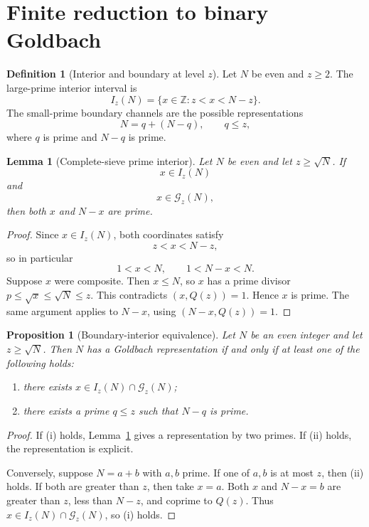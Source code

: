 \documentclass[11pt]{article}
\theoremstyle{plain}
\newtheorem{proposition}[theorem]{Proposition}
\newtheorem{lemma}[theorem]{Lemma}
\theoremstyle{definition}
\newtheorem{definition}[theorem]{Definition}
\theoremstyle{remark}
\newcommand{\Z}{\mathbb Z}
\newcommand{\G}{\mathcal G}
\begin{document}
\section{Finite reduction to binary Goldbach}
\label{sec:goldbach_reduction}

\begin{definition}[Interior and boundary at level \(z\)]
Let \(N\) be even and \(z\ge2\).  The large-prime interior interval is
\[
I_z(N)=\{x\in\Z:z<x<N-z\}.
\]
The small-prime boundary channels are the possible representations
\[
N=q+(N-q),\qquad q\le z,
\]
where \(q\) is prime and \(N-q\) is prime.
\end{definition}

\begin{lemma}[Complete-sieve prime interior]
\label{lem:complete_interior}
Let \(N\) be even and let \(z\ge\sqrt N\).  If
\[
x\in I_z(N)
\]
and
\[
x\in\G_z(N),
\]
then both \(x\) and \(N-x\) are prime.
\end{lemma}

\begin{proof}
Since \(x\in I_z(N)\), both coordinates satisfy
\[
z<x<N-z,
\]
so in particular
\[
1<x<N,
\qquad
1<N-x<N.
\]
Suppose \(x\) were composite.  Then \(x\le N\), so \(x\) has a prime divisor
\(p\le\sqrt x\le\sqrt N\le z\).  This contradicts \((x,Q(z))=1\).  Hence \(x\)
is prime.  The same argument applies to \(N-x\), using
\((N-x,Q(z))=1\).
\end{proof}

\begin{proposition}[Boundary-interior equivalence]
\label{prop:boundary_interior}
Let \(N\) be an even integer and let \(z\ge\sqrt N\).  Then \(N\) has a Goldbach
representation if and only if at least one of the following holds:
\begin{enumerate}[label=(\roman*)]
\item there exists \(x\in I_z(N)\cap\G_z(N)\);
\item there exists a prime \(q\le z\) such that \(N-q\) is prime.
\end{enumerate}
\end{proposition}

\begin{proof}
If (i) holds, Lemma~\ref{lem:complete_interior} gives a representation by two
primes.  If (ii) holds, the representation is explicit.

Conversely, suppose \(N=a+b\) with \(a,b\) prime.  If one of \(a,b\) is at most
\(z\), then (ii) holds.  If both are greater than \(z\), then take \(x=a\).  Both
\(x\) and \(N-x=b\) are greater than \(z\), less than \(N-z\), and coprime to
\(Q(z)\).  Thus \(x\in I_z(N)\cap\G_z(N)\), so (i) holds.
\end{proof}
\end{document}
